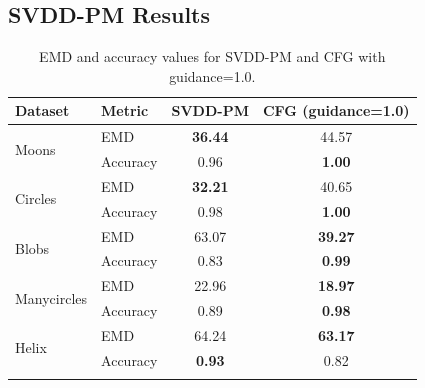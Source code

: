 \documentclass[11pt]{article}
\begin{document}
\subsection{SVDD-PM Results}
\begin{longtable}{|l|l|c|c|}
    \hline
    \textbf{Dataset} & \textbf{Metric} & \textbf{SVDD-PM} & \textbf{CFG (guidance=1.0)} \\
    \hline
    \multirow{2}{*}{Moons} & EMD & \textbf{36.44} & 44.57 \\
    \cline{2-4}
    & Accuracy & 0.96 & \textbf{1.00} \\
    \hline
    \multirow{2}{*}{Circles} & EMD & \textbf{32.21} & 40.65 \\
    \cline{2-4}
    & Accuracy & 0.98 & \textbf{1.00} \\
    \hline
    \multirow{2}{*}{Blobs} & EMD & 63.07 & \textbf{39.27} \\
    \cline{2-4}
    & Accuracy & 0.83 & \textbf{0.99} \\
    \hline
    \multirow{2}{*}{Manycircles} & EMD & 22.96 & \textbf{18.97} \\
    \cline{2-4}
    & Accuracy & 0.89 & \textbf{0.98} \\
    \hline
    \multirow{2}{*}{Helix} & EMD & 64.24 & \textbf{63.17} \\
    \cline{2-4}
    & Accuracy & \textbf{0.93} & 0.82 \\
    \hline
    \caption{EMD and accuracy values for SVDD-PM and CFG with guidance=1.0.}
\end{longtable}
\end{document}
